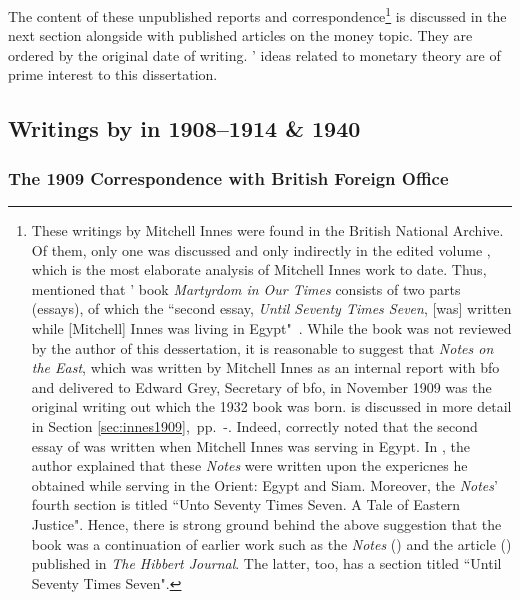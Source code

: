The content of these unpublished reports and correspondence\footnote{These writings by Mitchell Innes were found in the British National Archive. Of them, only one was discussed and only indirectly in the edited volume \cite{wray2004}, which is the most elaborate analysis of Mitchell Innes work to date. Thus, \cite{wraybell2004} mentioned that \citeauthor{innes1932}' book \textit{Martyrdom in Our Times} consists of two parts (essays), of which the ``second essay, \textit{Until Seventy Times Seven}, [was] written while [Mitchell] Innes was living in
 Egypt"~\citep[p.~6]{wraybell2004}. While the \cite{innes1932} book was not reviewed by the author of this dessertation, it is reasonable to suggest that \textit{Notes on the East}, which was written by Mitchell Innes as an internal report with \ac{bfo} and delivered to Edward Grey, Secretary of \ac{bfo}, in November 1909 was the original writing out which the 1932 book was born. \cite{innes1909} is discussed in more detail in Section \ref{sec:innes1909},~pp.~\pageref{sec:innes1909}-\pageref{sec:innes1910}. Indeed, \citeauthor{wraybell2004} correctly noted that the second essay of \cite{innes1932} was written when Mitchell Innes was serving in Egypt. In \cite{innes1909}, the author explained that these \textit{Notes} were written upon the expericnes he obtained while serving in the Orient: Egypt and Siam. Moreover, the \textit{Notes}' fourth section is titled ``Unto Seventy Times Seven. A Tale of Eastern Justice". Hence, there is strong ground behind the above suggestion that the \citeyear{innes1932} book was a continuation of earlier work such as the \textit{Notes} (\citeyear{innes1909}) and the article (\citeyear{innes1913_}) published in \textit{The Hibbert Journal}. The latter, too, has a section titled ``Until Seventy Times Seven".} is discussed in the next section alongside with published articles on the money topic. They are ordered by the original date of writing. \citeauthor{innes1913}' ideas related to monetary theory are of prime interest to this dissertation.

\subsection{Writings by \citeauthor{innes1913} in 1908--1914 \& 1940}

\subsubsection{The 1909 Correspondence with British Foreign Office}

